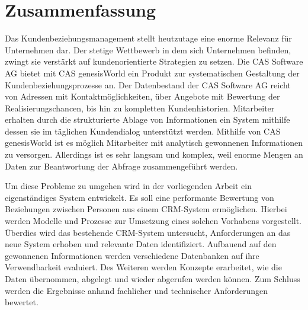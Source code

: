 
\chapter*{\centering Zusammenfassung}



Das Kundenbeziehungsmanagement stellt heutzutage eine enorme Relevanz für Unternehmen dar. Der stetige Wettbewerb in dem sich Unternehmen
befinden, zwingt sie verstärkt auf kundenorientierte Strategien zu setzen. Die CAS Software AG bietet mit CAS genesisWorld ein Produkt zur systematischen Gestaltung der Kundenbeziehungsprozesse an. Der Datenbestand der CAS Software AG reicht von Adressen mit Kontaktmöglichkeiten, über Angebote mit Bewertung der Realisierungschancen, bis hin zu kompletten Kundenhistorien. Mitarbeiter erhalten durch die strukturierte Ablage von Informationen ein System mithilfe dessen sie im täglichen Kundendialog unterstützt werden. Mithilfe von CAS genesisWorld ist es möglich Mitarbeiter mit analytisch gewonnenen Informationen zu versorgen. Allerdings ist es sehr langsam und komplex, weil enorme Mengen an Daten zur Beantwortung der Abfrage zusammengeführt werden.       

Um diese Probleme zu umgehen wird in der vorliegenden Arbeit ein eigenständiges System entwickelt. Es soll eine performante Bewertung von Beziehungen zwischen Personen aus einem CRM-System ermöglichen. Hierbei werden Modelle und Prozesse zur Umsetzung eines solchen Vorhabens vorgestellt. Überdies wird das bestehende CRM-System untersucht, Anforderungen an das neue System erhoben und relevante Daten identifiziert. Aufbauend auf den gewonnenen Informationen werden verschiedene Datenbanken auf ihre Verwendbarkeit evaluiert. Des Weiteren werden Konzepte erarbeitet, wie die Daten übernommen, abgelegt und wieder abgerufen werden können. Zum Schluss werden die Ergebnisse anhand fachlicher und technischer Anforderungen bewertet.